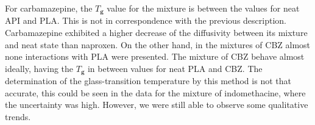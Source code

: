 For carbamazepine, the $T_\textbf{g}$ value for the mixture is between the values for neat API and PLA. This is not in correspondence with the previous description. Carbamazepine exhibited a higher decrease of the diffusivity between its mixture and neat state than naproxen. On the other hand, in the mixtures of CBZ almost none interactions with PLA were presented. The mixture of CBZ behave almost ideally, having the $T_\textbf{g}$ in between values for neat PLA and CBZ. The determination of the glass-transition temperature by this method is not that accurate, this could be seen in the data for the mixture of indomethacine, where the uncertainty was high. However, we were still able to observe some qualitative trends.
